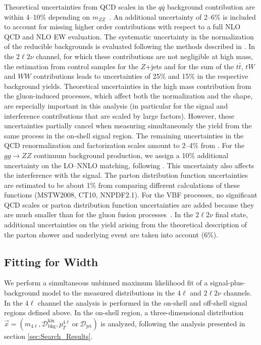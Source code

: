Theoretical uncertainties from QCD scales in the $q\bar{q}$ background contribution are
within 4--10\% depending on $m_{ZZ}$~\cite{Chatrchyan:2013mxa}. An additional uncertainty of
2--6\% is included to account for missing higher order contributions with respect to a full NLO
QCD and NLO EW evaluation. The systematic uncertainty
in the normalization of the reducible backgrounds is evaluated following the methods
described in \cite{Chatrchyan:2013mxa,Chatrchyan:2013yoa}. In the $2\ell 2\nu$
channel, for which these contributions are not negligible at high mass, the estimation
from control samples for the $Z$+jets and for the sum of the $t\bar{t}$, $tW$
and $WW$ contributions leads to uncertainties of 25\% and 15\% in the respective background
yields. Theoretical uncertainties in the high mass contribution from the gluon-induced
processes, which affect both the normalization and the shape, are especially important
in this analysis (in particular for the signal and interference contributions that
are scaled by large factors). However, these uncertainties partially cancel when
measuring simultaneously the yield from the same process in the on-shell signal region. The
remaining uncertainties in the QCD renormalization and factorization
scales amount to 2--4\% from \cite{Passarino:2013bha}. For the $gg \to ZZ$ continuum background production, we assign
a 10\% additional uncertainty on the LO--NNLO matching, following \cite{Bonvini:2013jha}. This
uncertainty also affects the interference with the signal. The parton distribution function uncertainties are estimated to be about 1\% from comparing different calculations of these functions (\textsc{MSTW2008}\cite{Martin:2009iq}, \textsc{CT10}\cite{Lai:2010vv}, \textsc{NNPDF2.1}\cite{Ball:2011mu}). For the VBF processes,
no significant QCD scales or parton distribution function uncertainties are added because they are much smaller than for the gluon fusion processes~\cite{Dittmaier:2011ti,Heinemeyer:2013tqa}.
In the $2\ell 2\nu$ final state, additional uncertainties on the yield arising from the theoretical
description of the parton shower and underlying event are taken into account (6\%).

\subsection{Fitting for Width}
\label{sec:Final_fit_width}

We perform a simultaneous unbinned maximum likelihood fit of a signal-plus-background model
to the measured distributions in the $4\ell$ and $2\ell2\nu$ channels. In the $4\ell$ channel
the analysis is performed in the on-shell and off-shell signal regions defined above. In the
on-shell region, a three-dimensional distribution
 \\ $\vec{x}= (m_{4\ell}, \mathcal{D}_\text{bkg}^\text{kin}, p_{T}^{4\ell}\ \text{or}\ \mathcal{D}_\text{jet})$
is analyzed, following the analysis presented in section \ref{sec:Search_Results}.

